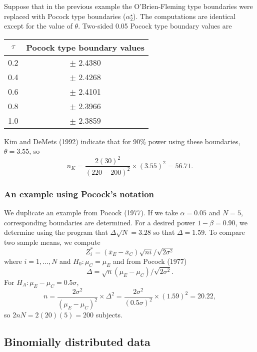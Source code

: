 Suppose that in the previous example the O'Brien-Fleming type boundaries were
replaced with Pocock type boundaries ($\alpha_2^{\star}$).  The computations
are identical except for the value of $\theta$.  Two-sided 0.05 Pocock
type boundary values are
\begin{center}
\begin{tabular}{cc} \hline
\multicolumn{1}{c}{$\tau$}&
\multicolumn{1}{c}{Pocock type boundary values} \\ \hline
 0.2 & $\pm$ 2.4380  \\
 0.4 & $\pm$ 2.4268  \\
 0.6 & $\pm$ 2.4101  \\
 0.8 & $\pm$ 2.3966  \\
 1.0 & $\pm$ 2.3859  \\
\hline
\end{tabular}
\end{center}
Kim and DeMets (1992) indicate that for 90\% power using these boundaries,
$\theta = 3.55$, so
\begin{displaymath}
  n_K = \frac{2(30)^2}{(220-200)^2} \times (3.55)^2 = 56.71.
\end{displaymath}


\subsubsection{An example using Pocock's notation}

We duplicate an example from Pocock (1977).  If we take $\alpha = 0.05$ and
$N = 5$, corresponding boundaries are determined.  For a desired power
$1-\beta = 0.90$, we determine using the program that $\Delta \sqrt{N} = 3.28$
so that $\Delta = 1.59$.  To compare two sample means, we compute
\begin{displaymath}
  Z_i^* = (\bar x_E - \bar x_C) \sqrt{n i} / \sqrt{2 \sigma^2}
\end{displaymath}
where $i=1,\ldots,N$ and $H_0: \mu_C = \mu_E$ and from Pocock (1977)
\begin{displaymath}
  \Delta = \sqrt{n} (\mu_E - \mu_C) / \sqrt{2 \sigma^2}.
\end{displaymath}
For $H_A: \mu_E - \mu_C = 0.5 \sigma$,
\begin{displaymath}
  n = \frac{2 \sigma^2}{(\mu_E - \mu_C)^2} \times \Delta^2
    = \frac{2 \sigma^2}{(0.5 \sigma)^2} \times  (1.59)^2
    = 20.22,
\end{displaymath}
so $2nN = 2(20)(5) = 200$ subjects.


\subsection{Binomially distributed data}

